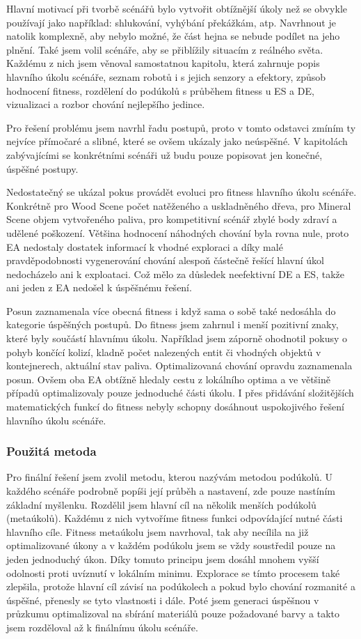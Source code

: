 Hlavní motivací při tvorbě scénářů bylo vytvořit obtížnější úkoly než se obvykle používají jako například: shlukování, vyhýbání překážkám, atp. Navrhnout je natolik komplexně, aby nebylo možné, že část hejna se nebude podílet na jeho plnění. Také jsem volil scénáře, aby se přiblížily situacím z reálného světa. Každému z nich jsem věnoval samostatnou kapitolu, která zahrnuje popis hlavního úkolu scénáře, seznam robotů i s jejich senzory a efektory, způsob hodnocení fitness, rozdělení do podúkolů s průběhem fitness u ES a DE, vizualizaci a rozbor chování nejlepšího jedince.  
\par
Pro řešení problému jsem navrhl řadu postupů, proto v tomto odstavci zmíním ty nejvíce přímočaré a slibné, které se ovšem ukázaly  jako neúspěšné. V kapitolách zabývajícími se konkrétními scénáři už budu pouze popisovat jen konečné, úspěšné postupy.
\par
Nedostatečný se ukázal pokus provádět evoluci pro fitness hlavního úkolu scénáře. Konkrétně pro Wood Scene počet natěženého a uskladněného dřeva, pro Mineral Scene objem vytvořeného paliva, pro kompetitivní scénář zbylé body zdraví a udělené poškození. Většina hodnocení náhodných chování byla rovna nule, proto EA nedostaly dostatek informací k vhodné exploraci a díky malé pravděpodobnosti vygenerování chování alespoň částečně řešící hlavní úkol nedocházelo ani k exploataci. Což mělo za důsledek neefektivní  DE a ES, takže ani jeden z EA nedošel k úspěšnému řešení. 
\par
Posun zaznamenala více obecná fitness i když sama o sobě také nedosáhla do kategorie úspěšných postupů. Do fitness jsem zahrnul i menší pozitivní znaky, které byly součástí hlavnímu úkolu. Například jsem záporně ohodnotil pokusy o pohyb končící kolizí, kladně počet nalezených entit či vhodných objektů v kontejnerech, aktuální stav paliva. Optimalizovaná chování opravdu zaznamenala posun. Ovšem oba EA obtížně hledaly cestu z lokálního optima a ve většině případů optimalizovaly pouze jednoduché části úkolu. I přes přidávání složitějších matematických funkcí do fitness nebyly schopny dosáhnout uspokojivého řešení hlavního úkolu scénáře.  
\subsubsection*{Použitá metoda}
Pro finální řešení jsem zvolil metodu, kterou nazývám metodou podúkolů. U každého scénáře podrobně popíši její průběh a nastavení, zde pouze nastíním základní  myšlenku. Rozdělil jsem hlavní cíl na několik menších podúkolů (metaúkolů). Každému z nich vytvoříme fitness funkci odpovídající nutné části hlavního cíle. Fitness metaúkolu jsem navrhoval, tak aby necílila na již optimalizované úkony a v každém podúkolu jsem se vždy soustředil pouze na jeden jednoduchý úkon. Díky tomuto principu jsem dosáhl mnohem vyšší odolnosti proti uvíznutí v lokálním minimu. Explorace se tímto procesem také zlepšila, protože hlavní cíl závisí na podúkolech a pokud bylo chování rozmanité a úspěšné, přenesly se tyto vlastnosti i dále. Poté jsem generaci úspěšnou v průzkumu optimalizoval na sbírání materiálů pouze požadované barvy a takto jsem rozděloval až k finálnímu úkolu scénáře. 
\par 

